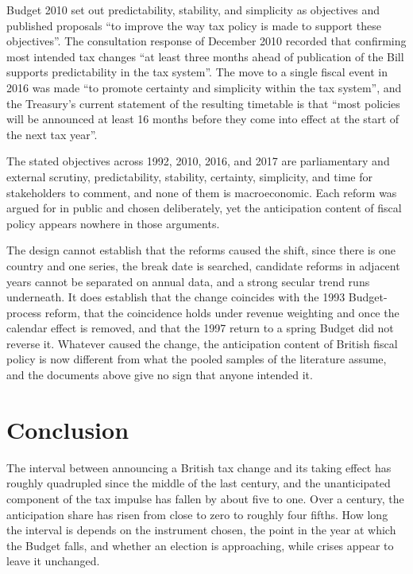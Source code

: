 \documentclass[11pt,a4paper]{article}
\begin{document}
Budget 2010 set out predictability, stability, and simplicity as objectives and published proposals ``to improve the way tax policy is made to support these objectives''. The consultation response of December 2010 recorded that confirming most
intended tax changes ``at least three months ahead of publication of the Bill supports predictability
in the tax system''. The move to a single fiscal event in 2016 was made ``to promote certainty and
simplicity within the tax system'', and the Treasury's current statement of the resulting timetable
is that ``most policies will be announced at least 16 months before they come into effect at the
start of the next tax year''.

The stated objectives across 1992, 2010, 2016, and 2017 are parliamentary and external scrutiny,
predictability, stability, certainty, simplicity, and time for stakeholders to comment, and none of
them is macroeconomic. Each reform was argued for in public and chosen deliberately, yet the
anticipation content of fiscal policy appears nowhere in those arguments.

The design cannot establish that the reforms caused the shift, since there is one country and one
series, the break date is searched, candidate reforms in adjacent years cannot be separated on
annual data, and a strong secular trend runs underneath. It does establish that the change coincides
with the 1993 Budget-process reform, that the coincidence holds under revenue weighting and once the
calendar effect is removed, and that the 1997 return to a spring Budget did not reverse it. Whatever
caused the change, the anticipation content of British fiscal policy is now different from what the
pooled samples of the literature assume, and the documents above give no sign that anyone intended
it.

\section{Conclusion}

The interval between announcing a British tax change and its taking effect has roughly quadrupled since the middle of the last century, and the unanticipated component of the tax impulse has fallen by about five to one. Over a century, the anticipation share has risen from close to zero to roughly four fifths. How long the interval is depends on the instrument chosen, the point in the year at which the Budget falls, and whether an election is approaching, while crises appear to leave it unchanged.
\end{document}
